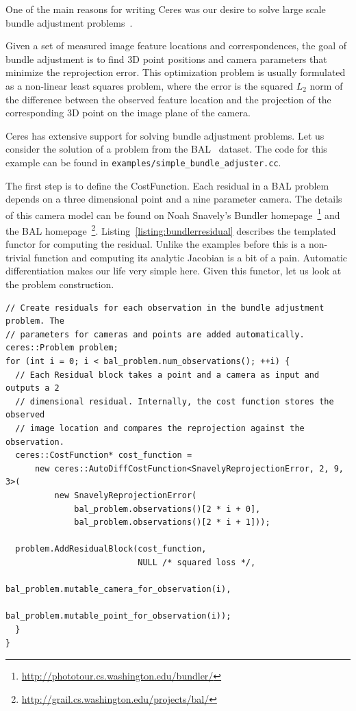 One of the main reasons for writing Ceres was our desire to solve large scale bundle adjustment problems~\cite{hartley-zisserman-book-2004,triggs-etal-1999}.



Given a set of measured image feature locations and correspondences, the goal of bundle adjustment is to find 3D point positions and camera parameters that minimize the reprojection error. This optimization problem is usually formulated as a non-linear least squares problem, where the error is the squared $L_2$ norm of the difference between the observed feature location and the projection of the corresponding 3D point on the image plane of the camera.

Ceres has extensive support for solving bundle adjustment problems. Let us consider the solution of a problem from the BAL~\cite{Agarwal10bal} dataset. The code for this example can be found in \texttt{examples/simple\_bundle\_adjuster.cc}.

The first step is to define the CostFunction. Each residual in a BAL
problem depends on a three dimensional point and a nine parameter
camera. The details of this camera model can be found on Noah
Snavely's Bundler
homepage~\footnote{\url{http://phototour.cs.washington.edu/bundler/}}
and the BAL
homepage~\footnote{\url{http://grail.cs.washington.edu/projects/bal/}}. Listing~\ref{listing:bundlerresidual}
describes the templated functor for computing the residual. Unlike the
examples before this is a non-trivial function and computing its
analytic Jacobian is a bit of a pain. Automatic differentiation makes
our life very simple here. Given this functor, let us look at the problem construction.

\begin{verbatim}
// Create residuals for each observation in the bundle adjustment problem. The
// parameters for cameras and points are added automatically.
ceres::Problem problem;
for (int i = 0; i < bal_problem.num_observations(); ++i) {
  // Each Residual block takes a point and a camera as input and outputs a 2
  // dimensional residual. Internally, the cost function stores the observed
  // image location and compares the reprojection against the observation.
  ceres::CostFunction* cost_function =
      new ceres::AutoDiffCostFunction<SnavelyReprojectionError, 2, 9, 3>(
          new SnavelyReprojectionError(
              bal_problem.observations()[2 * i + 0],
              bal_problem.observations()[2 * i + 1]));

  problem.AddResidualBlock(cost_function,
                           NULL /* squared loss */,
                           bal_problem.mutable_camera_for_observation(i),
                           bal_problem.mutable_point_for_observation(i));
  }
}
\end{verbatim}

